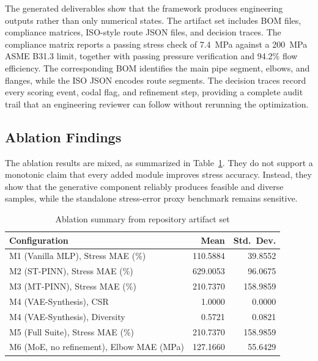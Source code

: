 \documentclass[conference]{IEEEtran}
\begin{document}
The generated deliverables show that the framework produces engineering outputs rather than only numerical states. The artifact set includes BOM files, compliance matrices, ISO-style route JSON files, and decision traces. The compliance matrix reports a passing stress check of \SI{7.4}{\mega\pascal} against a \SI{200}{\mega\pascal} ASME B31.3 limit, together with passing pressure verification and 94.2\% flow efficiency. The corresponding BOM identifies the main pipe segment, elbows, and flanges, while the ISO JSON encodes route segments. The decision traces record every scoring event, codal flag, and refinement step, providing a complete audit trail that an engineering reviewer can follow without rerunning the optimization.
 
\subsection{Ablation Findings}

The ablation results are mixed, as summarized in Table~\ref{tab:ablation}. They do not support a monotonic claim that every added module improves stress accuracy. Instead, they show that the generative component reliably produces feasible and diverse samples, while the standalone stress-error proxy benchmark remains sensitive.
 
\begin{table}[!t]

\caption{Ablation summary from repository artifact set}

\label{tab:ablation}

\centering

\setlength{\tabcolsep}{4pt}

\begin{tabular}{lrr}

\toprule

\textbf{Configuration} & \textbf{Mean} & \textbf{Std.\ Dev.} \\

\midrule

M1 (Vanilla MLP), Stress MAE (\%)    & 110.5884 &  39.8552 \\

M2 (ST-PINN), Stress MAE (\%)        & 629.0053 &  96.0675 \\

M3 (MT-PINN), Stress MAE (\%)        & 210.7370 & 158.9859 \\

M4 (VAE-Synthesis), CSR          &   1.0000 &   0.0000 \\

M4 (VAE-Synthesis), Diversity    &   0.5721 &   0.0821 \\

M5 (Full Suite), Stress MAE (\%)     & 210.7370 & 158.9859 \\

M6 (MoE, no refinement), Elbow MAE (MPa) & 127.1660 & 55.6429 \\
\bottomrule

\end{tabular}

\end{table}
 
\end{document}
